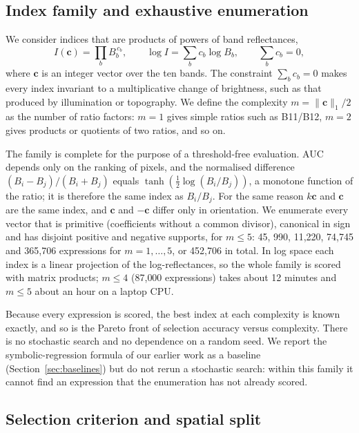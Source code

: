 \documentclass[preprint,authoryear,number]{elsarticle}
\begin{document}
\subsection{Index family and exhaustive enumeration}
\label{sec:enumeration}

We consider indices that are products of powers of band reflectances,
\begin{equation}
I(\mathbf{c}) = \prod_{b} B_b^{\,c_b}, \qquad \log I = \sum_{b} c_b \log B_b, \qquad \sum_b c_b = 0,
\label{eq:family}
\end{equation}
where $\mathbf{c}$ is an integer vector over the ten bands. The constraint $\sum_b c_b = 0$ makes every index invariant to a multiplicative change of brightness, such as that produced by illumination or topography. We define the complexity $m = \lVert \mathbf{c} \rVert_1 / 2$ as the number of ratio factors: $m = 1$ gives simple ratios such as B11/B12, $m = 2$ gives products or quotients of two ratios, and so on.

The family is complete for the purpose of a threshold-free evaluation. AUC depends only on the ranking of pixels, and the normalised difference $(B_i - B_j)/(B_i + B_j)$ equals $\tanh\left(\tfrac{1}{2}\log(B_i/B_j)\right)$, a monotone function of the ratio; it is therefore the same index as $B_i/B_j$. For the same reason $k\mathbf{c}$ and $\mathbf{c}$ are the same index, and $\mathbf{c}$ and $-\mathbf{c}$ differ only in orientation. We enumerate every vector that is primitive (coefficients without a common divisor), canonical in sign and has disjoint positive and negative supports, for $m \le 5$: 45, 990, 11{,}220, 74{,}745 and 365{,}706 expressions for $m = 1, \dots, 5$, or 452{,}706 in total. In log space each index is a linear projection of the log-reflectances, so the whole family is scored with matrix products; $m \le 4$ (87{,}000 expressions) takes about 12 minutes and $m \le 5$ about an hour on a laptop CPU.

Because every expression is scored, the best index at each complexity is known exactly, and so is the Pareto front of selection accuracy versus complexity. There is no stochastic search and no dependence on a random seed. We report the symbolic-regression formula of our earlier work as a baseline (Section~\ref{sec:baselines}) but do not rerun a stochastic search: within this family it cannot find an expression that the enumeration has not already scored.

\subsection{Selection criterion and spatial split}
\label{sec:split}
\end{document}
